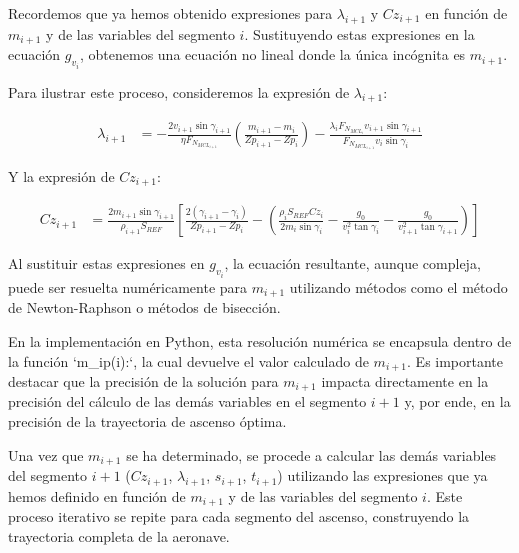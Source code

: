 \documentclass[fleqn]{article}
\begin{document}
Recordemos que ya hemos obtenido expresiones para $\lambda_{i+1}$ y $Cz_{i+1}$ en función de $m_{i+1}$ y de las variables del segmento $i$.  Sustituyendo estas expresiones en la ecuación $g_{v_i}$, obtenemos una ecuación no lineal donde la única incógnita es $m_{i+1}$.

Para ilustrar este proceso, consideremos la expresión de $\lambda_{i+1}$:

\begin{align}
    \lambda_{i+1} &= -\frac{2 v_{i+1} \sin \gamma_{i+1}}{\eta F_{N_{MCL_{i+1}}}} \left( \frac{m_{i+1} - m_i}{Zp_{i+1} - Zp_i} \right) - \frac{\lambda_i F_{N_{MCL_i}} v_{i+1} \sin \gamma_{i+1}}{F_{N_{MCL_{i+1}}} v_i \sin \gamma_i}
\end{align}

Y la expresión de $Cz_{i+1}$:

\begin{align}
Cz_{i+1} &= \frac{2 m_{i+1} \sin \gamma_{i+1}}{\rho_{i+1} S_{REF}} \left[ \frac{2(\gamma_{i+1} - \gamma_i)}{Zp_{i+1} - Zp_i} -  \left( \frac{\rho_i S_{REF} Cz_i}{2 m_i \sin \gamma_i} - \frac{g_0}{v_i^2 \tan \gamma_i} - \frac{g_0}{v_{i+1}^2 \tan \gamma_{i+1}} \right) \right]
\end{align}

Al sustituir estas expresiones en $g_{v_i}$, la ecuación resultante, aunque compleja,  puede ser resuelta numéricamente para $m_{i+1}$ utilizando métodos como el método de Newton-Raphson o métodos de bisección. 

En la implementación en Python, esta resolución numérica se encapsula dentro de la función `m\_ip(i):`, la cual devuelve el valor calculado de $m_{i+1}$.  Es importante destacar que la precisión de la solución para $m_{i+1}$ impacta directamente en la precisión del cálculo de las demás variables en el segmento $i+1$ y, por ende, en la precisión de la trayectoria de ascenso óptima.

Una vez que $m_{i+1}$ se ha determinado, se procede a calcular las demás variables del segmento $i+1$ ($Cz_{i+1}$, $\lambda_{i+1}$, $s_{i+1}$, $t_{i+1}$) utilizando las expresiones que ya hemos definido en función de $m_{i+1}$ y de las variables del segmento $i$.  Este proceso iterativo se repite para cada segmento del ascenso, construyendo la trayectoria completa de la aeronave.
\end{document}
